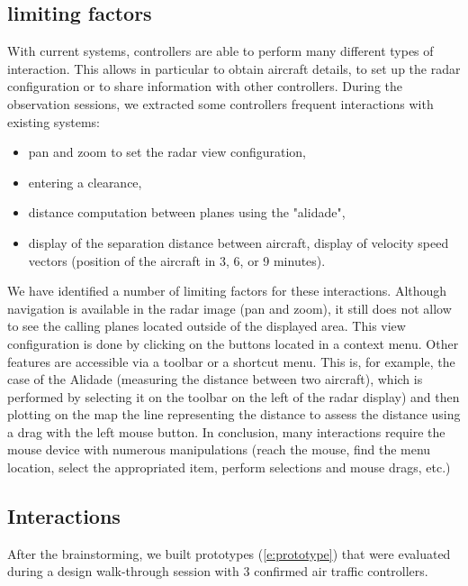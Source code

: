 \subsection{ limiting factors }

With current systems, controllers are able to perform many
different types of interaction. This allows in particular to
obtain aircraft details, to set up the radar configuration or to
share information with other controllers. During the
observation sessions, we extracted some controllers frequent
interactions with existing systems:
\begin{itemize}
\item pan and zoom to set the radar view configuration,
\item entering a clearance,
\item distance computation between planes using the "alidade",
\item display of the separation distance between aircraft,
display of velocity speed vectors (position of the aircraft in
3, 6, or 9 minutes).
\end{itemize}

We have identified a number of limiting factors for these
interactions. Although navigation is available in the radar
image (pan and zoom), it still does not allow to see the
calling planes located outside of the displayed area. This
view configuration is done by clicking on the buttons located
in a context menu. Other features are accessible via a toolbar
or a shortcut menu. This is, for example, the case of the
Alidade (measuring the distance between two aircraft), which
is performed by selecting it on the toolbar on the left of the
radar display) and then plotting on the map the line
representing the distance to assess the distance using a drag
with the left mouse button.
In conclusion, many interactions require the mouse device with
numerous manipulations (reach the mouse, find the menu
location, select the appropriated item, perform selections and mouse drags, etc.)

\subsection{Interactions}
After the brainstorming, we built prototypes (\autoref{e:prototype}) that were
evaluated during a design walk-through session with 3
confirmed air traffic controllers.

